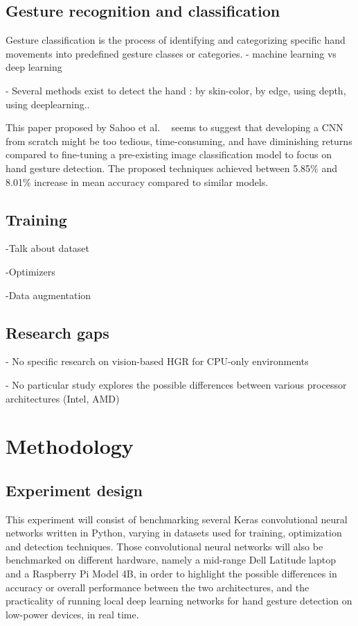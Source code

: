 \documentclass[12pt]{article}
\begin{document}
\subsection{Gesture recognition and classification}

Gesture classification is the process of identifying and categorizing specific hand movements into predefined gesture classes or categories. 
- machine learning vs deep learning

- Several methods exist to detect the hand : by skin-color, by edge, using depth, using deeplearning..

This paper proposed by Sahoo et al. ~\cite{sahoo2022real} seems to suggest that developing a CNN from scratch might be too tedious, time-consuming, and have diminishing returns compared to fine-tuning a pre-existing image classification model to focus on hand gesture detection. The proposed techniques achieved between 5.85\% and 8.01\% increase in mean accuracy compared to similar models.

\subsection{Training}

-Talk about dataset

-Optimizers

-Data augmentation

\subsection{Research gaps}

- No specific research on vision-based HGR for CPU-only environments

- No particular study explores the possible differences between various processor architectures (Intel, AMD)

\section{Methodology}

\subsection{Experiment design}

This experiment will consist of benchmarking several Keras convolutional neural networks written in Python, varying in datasets used for training, optimization and detection techniques. Those convolutional neural networks will also be benchmarked on different hardware, namely a mid-range Dell Latitude laptop and a Raspberry Pi Model 4B, in order to highlight the possible differences in accuracy or overall performance between the two architectures, and the practicality of running local deep learning networks for hand gesture detection on low-power devices, in real time.
\end{document}

